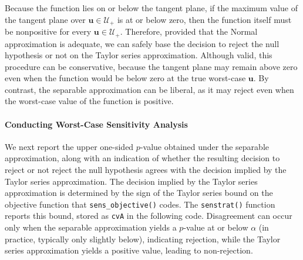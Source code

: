 \documentclass[twoside,11pt]{article}
\begin{document}
Because the function lies on or below the tangent plane, if the maximum
value of the tangent plane over \(\bm{u} \in \mathcal{U}_{+}\) is at or
below zero, then the function itself must be nonpositive for every
\(\bm{u} \in \mathcal{U}_{+}\). Therefore, provided that the Normal
approximation is adequate, we can safely base the decision to reject the
null hypothesis or not on the Taylor series approximation. Although valid, this
procedure can be conservative, because the tangent plane may remain above
zero even when the function would be below zero at the true worst-case
\(\bm{u}\). By contrast, the separable approximation can be liberal, as it
may reject even when the worst-case value of the function is positive.

\paragraph{Conducting Worst-Case Sensitivity
Analysis}\label{conducting-worst-case-sensitivity-analysis}

We next report the upper one-sided \(p\)-value obtained under the
separable approximation, along with an indication of whether the
resulting decision to reject or not reject the null hypothesis agrees
with the decision implied by the Taylor series approximation. The decision
implied by the Taylor series approximation is determined by the sign of the
Taylor series bound on the objective function that
\texttt{sens\_objective()} codes. The \texttt{senstrat()} function reports
this bound, stored as \texttt{cvA} in the following code. Disagreement can occur only when the
separable approximation yields a \(p\)-value at or below \(\alpha\) (in practice, typically only slightly below),
indicating rejection, while the Taylor series approximation yields a
positive value, leading to non-rejection.
\end{document}

